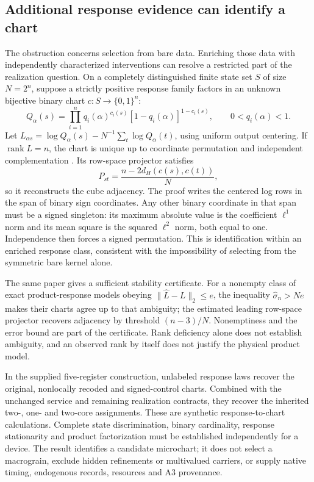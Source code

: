 \subsection*{Additional response evidence can identify a chart}
The obstruction concerns selection from bare data. Enriching those data with independently characterized interventions can resolve a restricted part of the realization question. On a completely distinguished finite state set $S$ of size $N=2^n$, suppose a strictly positive response family factors in an unknown bijective binary chart $c:S\to\{0,1\}^n$:
\[
Q_\alpha(s)=\prod_{i=1}^n q_i(\alpha)^{c_i(s)}
                    [1-q_i(\alpha)]^{1-c_i(s)},\qquad0<q_i(\alpha)<1.
\]
Let $L_{\alpha s}=\log Q_\alpha(s)-N^{-1}\sum_t\log Q_\alpha(t)$, using uniform output centering. If $\operatorname{rank}L=n$, the chart is unique up to coordinate permutation and independent complementation \cite{RodgersInterventional2026}. Its row-space projector satisfies
\[
P_{st}=\frac{n-2d_H(c(s),c(t))}{N},
\]
so it reconstructs the cube adjacency. The proof writes the centered log rows in the span of binary sign coordinates. Any other binary coordinate in that span must be a signed singleton: its maximum absolute value is the coefficient $\ell^1$ norm and its mean square is the squared $\ell^2$ norm, both equal to one. Independence then forces a signed permutation. This is identification within an enriched response class, consistent with the impossibility of selecting from the symmetric bare kernel alone.

The same paper gives a sufficient stability certificate. For a nonempty class of exact product-response models obeying $\|\widehat L-L\|_2\le e$, the inequality $\widehat\sigma_n>Ne$ makes their charts agree up to that ambiguity; the estimated leading row-space projector recovers adjacency by threshold $(n-3)/N$. Nonemptiness and the error bound are part of the certificate. Rank deficiency alone does not establish ambiguity, and an observed rank by itself does not justify the physical product model.

In the supplied five-register construction, unlabeled response laws recover the original, nonlocally recoded and signed-control charts. Combined with the unchanged service and remaining realization contracts, they recover the inherited two-, one- and two-core assignments. These are synthetic response-to-chart calculations. Complete state discrimination, binary cardinality, response stationarity and product factorization must be established independently for a device. The result identifies a candidate microchart; it does not select a macrograin, exclude hidden refinements or multivalued carriers, or supply native timing, endogenous records, resources and A3 provenance.

